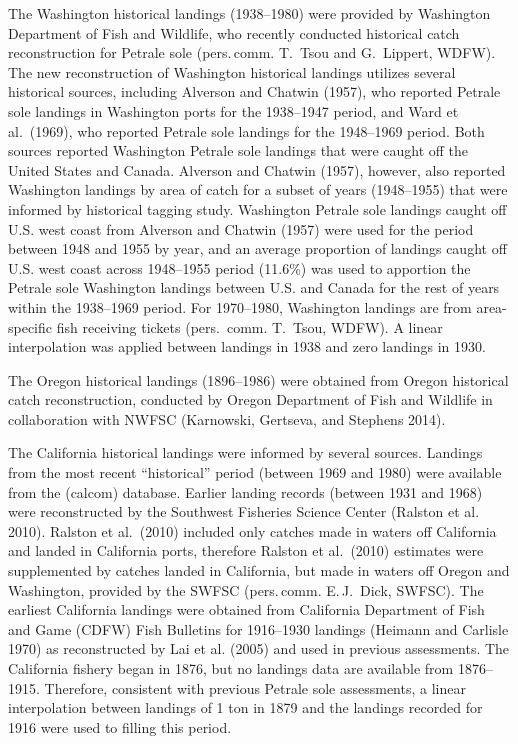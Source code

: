 \documentclass[
]{scrartcl}
\begin{document}
The Washington historical landings (1938--1980) were provided by
Washington Department of Fish and Wildlife, who recently conducted
historical catch reconstruction for Petrale sole (pers.\,comm. T.\ Tsou
and G.\ Lippert, WDFW). The new reconstruction of Washington historical
landings utilizes several historical sources, including Alverson and
Chatwin (1957), who reported Petrale sole landings in Washington ports
for the 1938--1947 period, and Ward et al.~(1969), who reported Petrale
sole landings for the 1948--1969 period. Both sources reported Washington
Petrale sole landings that were caught off the United States and Canada.
Alverson and Chatwin (1957), however, also reported Washington landings
by area of catch for a subset of years (1948--1955) that were informed by
historical tagging study. Washington Petrale sole landings caught off
U.S. west coast from Alverson and Chatwin (1957) were used for the
period between 1948 and 1955 by year, and an average proportion of
landings caught off U.S. west coast across 1948--1955 period (11.6\%) was
used to apportion the Petrale sole Washington landings between U.S. and
Canada for the rest of years within the 1938--1969 period. For 1970--1980,
Washington landings are from area-specific fish receiving tickets (pers.\,
comm. T.\ Tsou, WDFW). A linear interpolation was applied between
landings in 1938 and zero landings in 1930.

The Oregon historical landings (1896--1986) were obtained from Oregon
historical catch reconstruction, conducted by Oregon Department of Fish
and Wildlife in collaboration with NWFSC (Karnowski, Gertseva, and
Stephens 2014).

The California historical landings were informed by several sources.
Landings from the most recent ``historical'' period (between 1969 and
1980) were available from the (\textsf{calcom}) database. Earlier landing records
(between 1931 and 1968) were reconstructed by the Southwest Fisheries
Science Center (Ralston et al. 2010). Ralston et al.~(2010) included
only catches made in waters off California and landed in California
ports, therefore Ralston et al.~(2010) estimates were supplemented by
catches landed in California, but made in waters off Oregon and
Washington, provided by the SWFSC (pers.\,comm. E.\,J.\ Dick, SWFSC). The
earliest California landings were obtained from California Department of
Fish and Game (CDFW) Fish Bulletins for 1916--1930 landings (Heimann and
Carlisle 1970) as reconstructed by Lai et al. (2005) and used in
previous assessments. The California fishery began in 1876, but no
landings data are available from 1876--1915. Therefore, consistent with
previous Petrale sole assessments, a linear interpolation between
landings of 1 ton in 1879 and the landings recorded for 1916 were used
to filling this period.
\end{document}
